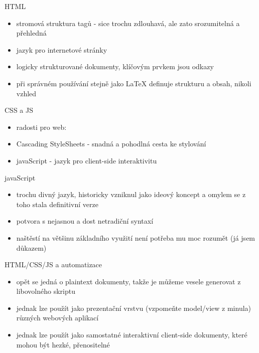 \documentclass{beamer}
\begin{document}
\begin{frame}{HTML}
  \begin{itemize}
    \item stromová struktura tagů - sice trochu zdlouhavá, ale zato srozumitelná a přehledná
    \item jazyk pro internetové stránky
    \item logicky strukturované dokumenty, klíčovým prvkem jsou odkazy
    \item při správném používání stejně jako LaTeX definuje strukturu a obsah, nikoli vzhled
  \end{itemize}
\end{frame}

\begin{frame}{CSS a JS}
  \begin{itemize}
    \item radosti pro web:
    \item Cascading StyleSheets - snadná a pohodlná cesta ke stylování
    \item javaScript - jazyk pro client-side interaktivitu
  \end{itemize}
\end{frame}

\begin{frame}{javaScript}
  \begin{itemize}
    \item trochu divný jazyk, historicky vzniknul jako ideový koncept a omylem se z toho stala definitivní verze
    \item potvora s nejasnou a dost netradiční syntaxí
    \item naštěstí na většinu základního využití není potřeba mu moc rozumět (já jsem důkazem)
  \end{itemize}
\end{frame}

\begin{frame}{HTML/CSS/JS a automatizace}
  \begin{itemize}
    \item opět se jedná o plaintext dokumenty, takže je můžeme vesele generovat z libovolného skriptu
    \item jednak lze použít jako prezentační vrstvu (vzpomeňte model/view z minula) různých webových aplikací
    \item jednak lze použít jako samostatné interaktivní client-side dokumenty, které mohou být hezké, přenositelné
  \end{itemize}
\end{frame}
\end{document}
